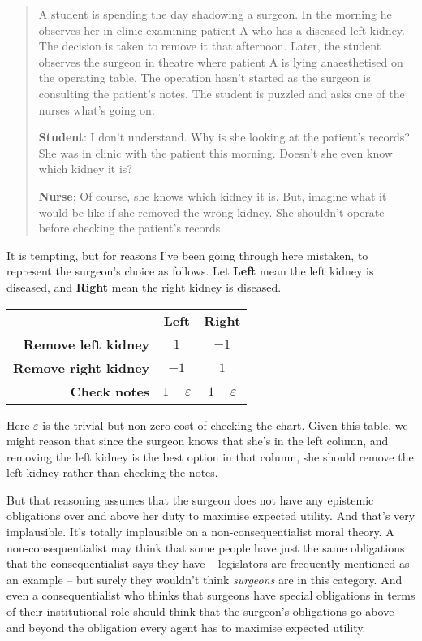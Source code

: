 \documentclass[11pt,oneside]{book}
\begin{document}
\begin{quote}
A student is spending the day shadowing a surgeon. In the morning he observes her in clinic examining patient A who has a diseased left kidney. The decision is taken to remove it that afternoon. Later, the student observes the surgeon in theatre where patient A is lying anaesthetised on the operating table. The operation hasn't started as the surgeon is consulting the patient's notes. The student is puzzled and asks one of the nurses what's going on: 

\textbf{Student}: I don't understand. Why is she looking at the patient's records? She was in clinic with the patient this morning. Doesn't she even know which kidney it is? 

\textbf{Nurse}: Of course, she knows which kidney it is. But, imagine what it would be like if she removed the wrong kidney. She shouldn't operate before checking the patient's records. \citep[1144-1145]{Brown2008-BROKAP}
\end{quote}

\noindent It is tempting, but for reasons I've been going through here mistaken, to represent the surgeon's choice as follows. Let \textbf{Left} mean the left kidney is diseased, and \textbf{Right} mean the right kidney is diseased.

\begin{center}
\begin{tabular}{r c c}
 & \textbf{Left} & \textbf{Right} \\
\textbf{Remove left kidney} & $1$ & $-1$ \\
\textbf{Remove right kidney} & $-1$ & $1$ \\
\textbf{Check notes} & $1-\varepsilon$ & $1-\varepsilon$ \\
\end{tabular}
\end{center}

\noindent Here $\varepsilon$ is the trivial but non-zero cost of checking the chart. Given this table, we might reason that since the surgeon knows that she's in the left column, and removing the left kidney is the best option in that column, she should remove the left kidney rather than checking the notes.

But that reasoning assumes that the surgeon does not have any epistemic obligations over and above her duty to maximise expected utility. And that's very implausible. It's totally implausible on a non-consequentialist moral theory. A non-consequentialist may think that some people have just the same obligations that the consequentialist says they have -- legislators are frequently mentioned as an example -- but surely they wouldn't think \textit{surgeons} are in this category. And even a consequentialist who thinks that surgeons have special obligations in terms of their institutional role should think that the surgeon's obligations go above and beyond the obligation every agent has to maximise expected utility.
\end{document}
